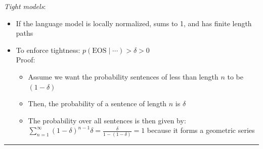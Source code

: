 \emph{Tight models}:
\begin{itemize}
    \item If the language model is locally normalized, sums to 1, and has finite length paths
    \item To enforce tightness:
    $
    p(\textrm{EOS} \mid \cdots) > \delta > 0
    $\\
    Proof:
    \begin{itemize}
        \item Assume we want the probability sentences of less than length $n$ to be $(1-\delta)$
        \item Then, the probability of a sentence of length $n$ is $\delta$
        \item The probability over all sentences is then given by: $
        \sum_{n=1}^\infty (1-\delta)^{n-1} \delta = \frac{\delta}{1-(1-\delta)} = 1
        $ because it forms a geometric series
    \end{itemize}
\end{itemize}

{\color{black}\hrule height 0.001mm}


